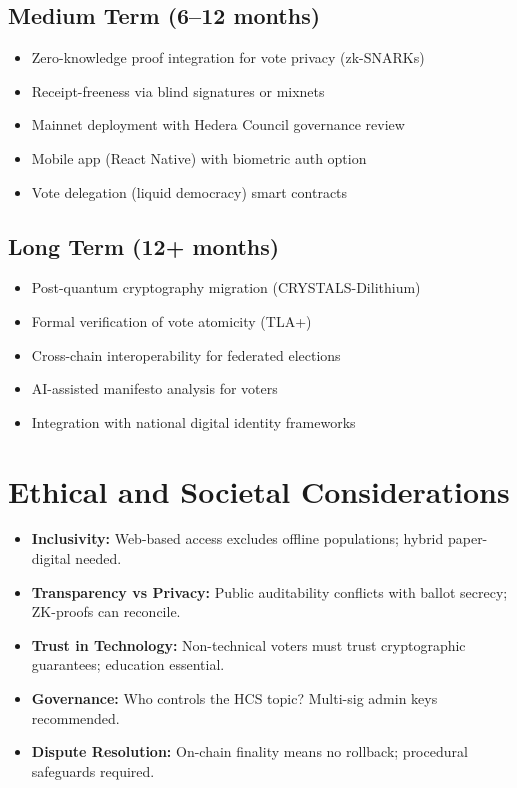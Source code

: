 \subsection{Medium Term (6--12 months)}
\begin{itemize}
    \item Zero-knowledge proof integration for vote privacy (zk-SNARKs)
    \item Receipt-freeness via blind signatures or mixnets
    \item Mainnet deployment with Hedera Council governance review
    \item Mobile app (React Native) with biometric auth option
    \item Vote delegation (liquid democracy) smart contracts
\end{itemize}

\subsection{Long Term (12+ months)}
\begin{itemize}
    \item Post-quantum cryptography migration (CRYSTALS-Dilithium)
    \item Formal verification of vote atomicity (TLA+)
    \item Cross-chain interoperability for federated elections
    \item AI-assisted manifesto analysis for voters
    \item Integration with national digital identity frameworks
\end{itemize}

\section{Ethical and Societal Considerations}
\label{sec:ethical}

\begin{itemize}
    \item \textbf{Inclusivity:} Web-based access excludes offline populations; hybrid paper-digital needed.
    \item \textbf{Transparency vs Privacy:} Public auditability conflicts with ballot secrecy; ZK-proofs can reconcile.
    \item \textbf{Trust in Technology:} Non-technical voters must trust cryptographic guarantees; education essential.
    \item \textbf{Governance:} Who controls the HCS topic? Multi-sig admin keys recommended.
    \item \textbf{Dispute Resolution:} On-chain finality means no rollback; procedural safeguards required.
\end{itemize}

